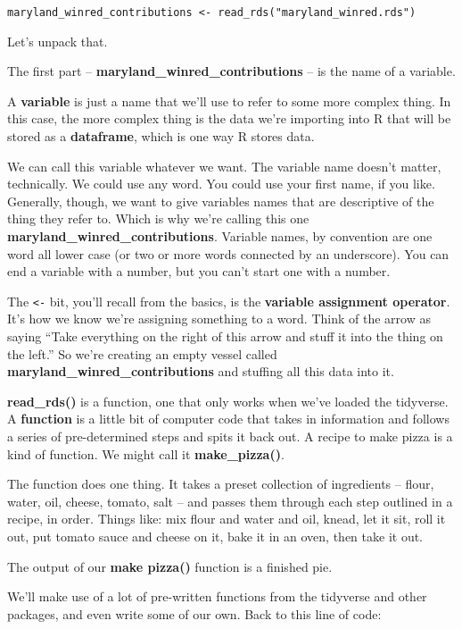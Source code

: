 \documentclass[
  letterpaper,
  DIV=11,
  numbers=noendperiod]{scrreprt}
\begin{document}
\texttt{maryland\_winred\_contributions\ \textless{}-\ read\_rds("maryland\_winred.rds")}

Let's unpack that.

The first part -- \textbf{maryland\_winred\_contributions} -- is the
name of a variable.

A \textbf{variable} is just a name that we'll use to refer to some more
complex thing. In this case, the more complex thing is the data we're
importing into R that will be stored as a \textbf{dataframe}, which is
one way R stores data.

We can call this variable whatever we want. The variable name doesn't
matter, technically. We could use any word. You could use your first
name, if you like. Generally, though, we want to give variables names
that are descriptive of the thing they refer to. Which is why we're
calling this one \textbf{maryland\_winred\_contributions}. Variable
names, by convention are one word all lower case (or two or more words
connected by an underscore). You can end a variable with a number, but
you can't start one with a number.

The \texttt{\textless{}-} bit, you'll recall from the basics, is the
\textbf{variable assignment operator}. It's how we know we're assigning
something to a word. Think of the arrow as saying ``Take everything on
the right of this arrow and stuff it into the thing on the left.'' So
we're creating an empty vessel called
\textbf{maryland\_winred\_contributions} and stuffing all this data into
it.

\textbf{read\_rds()} is a function, one that only works when we've
loaded the tidyverse. A \textbf{function} is a little bit of computer
code that takes in information and follows a series of pre-determined
steps and spits it back out. A recipe to make pizza is a kind of
function. We might call it \textbf{make\_pizza()}.

The function does one thing. It takes a preset collection of ingredients
-- flour, water, oil, cheese, tomato, salt -- and passes them through
each step outlined in a recipe, in order. Things like: mix flour and
water and oil, knead, let it sit, roll it out, put tomato sauce and
cheese on it, bake it in an oven, then take it out.

The output of our \textbf{make pizza()} function is a finished pie.

We'll make use of a lot of pre-written functions from the tidyverse and
other packages, and even write some of our own. Back to this line of
code:
\end{document}
